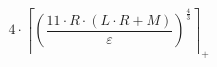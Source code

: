 \[4 \cdot \left\lceil \left(\frac{11 \cdot R \cdot \left(L \cdot R + M\right)}{\varepsilon}\right)^{\frac{4}{3}} \right\rceil_{+}\]
